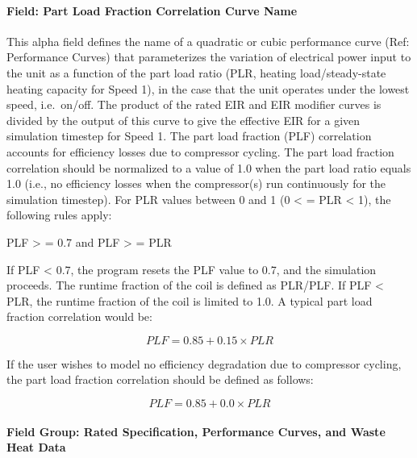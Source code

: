 \paragraph{Field: Part Load Fraction Correlation Curve Name}\label{field-part-load-fraction-correlation-curve-name-11}

This alpha field defines the name of a quadratic or cubic performance curve (Ref: Performance Curves) that parameterizes the variation of electrical power input to the unit as a function of the part load ratio (PLR, heating load/steady-state heating capacity for Speed 1), in the case that the unit operates under the lowest speed, i.e.~on/off. The product of the rated EIR and EIR modifier curves is divided by the output of this curve to give the effective EIR for a given simulation timestep for Speed 1. The part load fraction (PLF) correlation accounts for efficiency losses due to compressor cycling. The part load fraction correlation should be normalized to a value of 1.0 when the part load ratio equals 1.0 (i.e., no efficiency losses when the compressor(s) run continuously for the simulation timestep). For PLR values between 0 and 1 (0 \textless{} = PLR \textless{} 1), the following rules apply:

PLF \textgreater{} = 0.7 and PLF \textgreater{} = PLR

If PLF \textless{} 0.7, the program resets the PLF value to 0.7, and the simulation proceeds. The runtime fraction of the coil is defined as PLR/PLF. If PLF \textless{} PLR, the runtime fraction of the coil is limited to 1.0. A typical part load fraction correlation would be:

\begin{equation}
PLF = 0.85 + 0.15 \times PLR
\end{equation}

If the user wishes to model no efficiency degradation due to compressor cycling, the part load fraction correlation should be defined as follows:

\begin{equation}
PLF = 0.85 + 0.0 \times PLR
\end{equation}

\paragraph{Field Group: Rated Specification, Performance Curves, and Waste Heat Data}\label{field-group-rated-specification-performance-curves-and-waste-heat-data-2}


